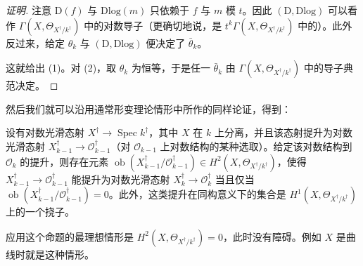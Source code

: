\begin{proof}[证明]
注意 $\mathrm{D}(f)$ 与 $\mathrm{Dlog}(m)$ 只依赖于 $f$ 与 $m$ 模 $t$。因此 $(\mathrm{D},\mathrm{Dlog})$ 可以看作 $\Gamma(X,\Theta_{X^{\dagger}/k^{\dagger}})$ 中的对数导子（更确切地说，是 $t^k\Gamma(X,\Theta_{X^{\dagger}/k^{\dagger}})$ 中的）。此外反过来，给定 $\theta_k$ 与 $(\mathrm{D},\mathrm{Dlog})$ 便决定了 $\bar\theta_k$。

这就给出 (1)。对 (2)，取 $\theta_k$ 为恒等，于是任一 $\bar\theta_k$ 由 $\Gamma(X,\Theta_{X^{\dagger}/k^{\dagger}})$ 中的导子典范决定。
\end{proof}

然后我们就可以沿用通常形变理论情形中所作的同样论证，得到：

\begin{proposition}
设有对数光滑态射 $X^{\dagger}\to\operatorname{Spec} k^{\dagger}$，其中 $X$ 在 $k$ 上分离，并且该态射提升为对数光滑态射 $X_{k-1}^{\dagger}\to\mathcal{O}_{k-1}^{\dagger}$（对 $\mathcal{O}_{k-1}$ 上对数结构的某种选取）。给定该对数结构到 $\mathcal{O}_k$ 的提升，则存在元素 $\operatorname{ob}(X_{k-1}^{\dagger}/\mathcal{O}_{k-1}^{\dagger})\in H^2(X,\Theta_{X^{\dagger}/k^{\dagger}})$，使得 $X_{k-1}^{\dagger}\to\mathcal{O}_{k-1}^{\dagger}$ 能提升为对数光滑态射 $X_k^{\dagger}\to\mathcal{O}_k^{\dagger}$ 当且仅当 $\operatorname{ob}(X_{k-1}^{\dagger}/\mathcal{O}_{k-1}^{\dagger})=0$。此外，这类提升在同构意义下的集合是 $H^1(X,\Theta_{X^{\dagger}/k^{\dagger}})$ 上的一个挠子。
\end{proposition}

应用这个命题的最理想情形是 $H^2(X,\Theta_{X^{\dagger}/k^{\dagger}})=0$，此时没有障碍。例如 $X$ 是曲线时就是这种情形。

